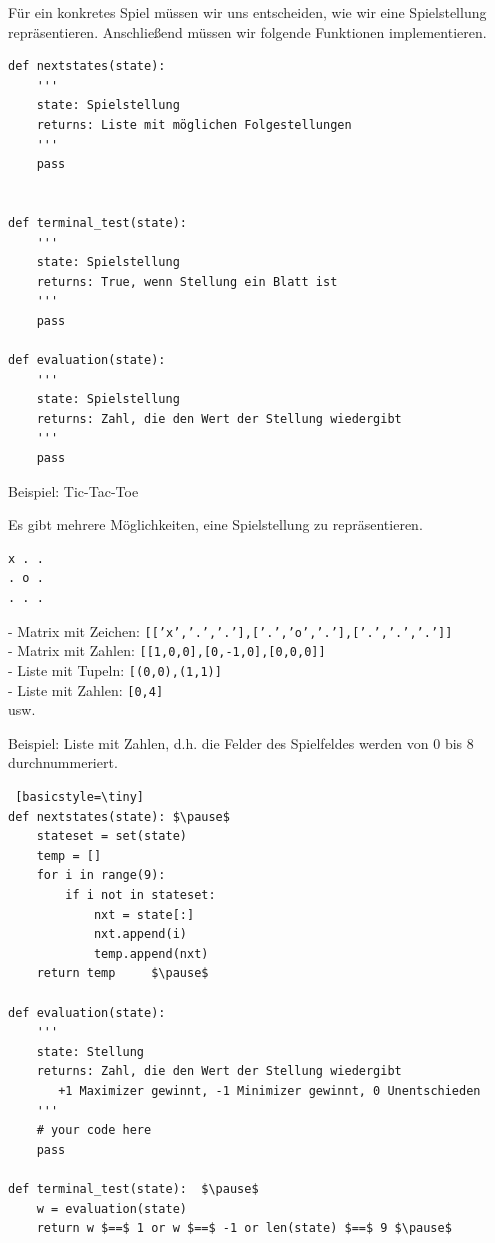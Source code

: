 \begin{frame}[fragile]
Für ein konkretes Spiel müssen wir uns entscheiden, wie wir eine Spielstellung repräsentieren. Anschließend müssen wir folgende Funktionen implementieren.
\begin{lstlisting}[basicstyle=\tiny]
def nextstates(state):
    '''
    state: Spielstellung
    returns: Liste mit möglichen Folgestellungen
    '''
    pass
    
        
def terminal_test(state):
    '''
    state: Spielstellung
    returns: True, wenn Stellung ein Blatt ist
    '''
    pass

def evaluation(state):
    '''
    state: Spielstellung
    returns: Zahl, die den Wert der Stellung wiedergibt
    '''
    pass
\end{lstlisting} 
\end{frame}

\begin{frame}[fragile]
Beispiel: Tic-Tac-Toe

Es gibt mehrere Möglichkeiten, eine Spielstellung zu repräsentieren.
\begin{lstlisting} 
x . . 
. o . 
. . . 
\end{lstlisting}  \pause
- Matrix mit Zeichen: \texttt{[['x','.','.'],['.','o','.'],['.','.','.']]} \\
- Matrix mit Zahlen:   \texttt{[[1,0,0],[0,-1,0],[0,0,0]]} \\
- Liste mit Tupeln: \texttt{[(0,0),(1,1)]} \\
- Liste mit Zahlen: \texttt{[0,4]} \\
usw.

\end{frame}

\begin{frame}[fragile]
Beispiel: Liste mit Zahlen, d.h. die Felder des Spielfeldes werden von 0 bis 8 durchnummeriert.
\begin{lstlisting} [basicstyle=\tiny]
def nextstates(state): $\pause$
    stateset = set(state)
    temp = []
    for i in range(9):
        if i not in stateset:
            nxt = state[:]
            nxt.append(i)
            temp.append(nxt)
    return temp     $\pause$

def evaluation(state): 
    '''
    state: Stellung
    returns: Zahl, die den Wert der Stellung wiedergibt
       +1 Maximizer gewinnt, -1 Minimizer gewinnt, 0 Unentschieden
    '''
    # your code here
    pass

def terminal_test(state):  $\pause$
    w = evaluation(state)
    return w $==$ 1 or w $==$ -1 or len(state) $==$ 9 $\pause$


\end{lstlisting} 




\end{frame}



